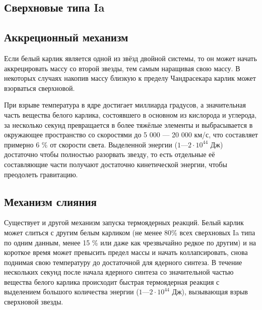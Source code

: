 \subsection{Сверхновые типа Ia}
\subsection{Аккреционный механизм}
Если белый карлик является одной из звёзд двойной системы, то он может начать аккрецировать массу со второй звезды, тем самым наращивая свою массу. В некоторых случаях накопив массу близкую к пределу Чандрасекара карлик может взорваться сверхновой.

При взрыве температура в ядре достигает миллиарда градусов, а значительная часть вещества белого карлика, состоявшего в основном из кислорода и углерода, за несколько секунд превращается в более тяжёлые элементы и выбрасывается в окружающее пространство со скоростями до 5 000 — 20 000 км/с, что составляет примерно 6 \% от скорости света. Выделенной энергии ($1—2\cdot10^{44}$ Дж) достаточно чтобы полностью разорвать звезду, то есть отдельные её составляющие части получают достаточно кинетической энергии, чтобы преодолеть гравитацию.
\subsection{Механизм слияния}
Существует и другой механизм запуска термоядерных реакций. Белый карлик может слиться с другим белым карликом (не менее 80\% всех сверхновых Ia типа по одним данным, менее 15 \% или даже как чрезвычайно редкое по другим) и на короткое время может превысить предел массы и начать коллапсировать, снова поднимая свою температуру до достаточной для ядерного синтеза. В течение нескольких секунд после начала ядерного синтеза со значительной частью вещества белого карлика происходит быстрая термоядерная реакция с выделением большого количества энергии ($1—2\cdot10^{44}$ Дж), вызывающая взрыв сверхновой звезды.
